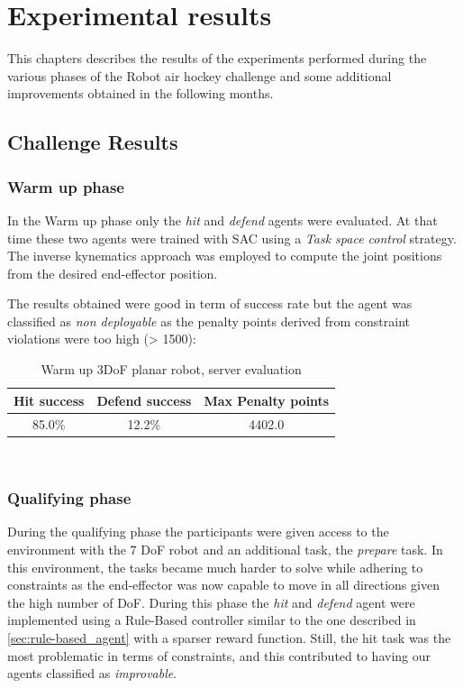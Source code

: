 \chapter{Experimental results}
\label{ch:experimental_results}

This chapters describes the results of the experiments performed during the various phases of the Robot air hockey challenge and some additional improvements obtained in the following months.

\section{Challenge Results}
\subsection{Warm up phase}
In the Warm up phase only the \textit{hit} and \textit{defend} agents were evaluated.
At that time these two agents were trained with SAC using a \textit{Task space control} strategy. The inverse kynematics approach was employed to compute the joint positions from
the desired end-effector position.

The results obtained were good in term of success rate but the agent was classified as \textit{non deployable} as the penalty points derived from constraint violations were
too high (> 1500):

\begin{table}[H]
    \centering 
    \begin{tabular}{|c | c | c |}
    \hline
     \textbf{Hit success} & \textbf{Defend success} & \textbf{Max Penalty points} \T\B \\
    \hline \hline
    85.0\% & 12.2\% & 4402.0 \T\B \\
    \hline
    \end{tabular}
    \\[10pt]
    \caption{Warm up 3DoF planar robot, server evaluation}
    \label{table:warm-up_results}
\end{table}

\subsection{Qualifying phase}
During the qualifying phase the participants were given access to the environment with the 7 DoF robot and an additional task, the \textit{prepare} task. 
In this environment, the tasks became much harder to solve
while adhering to constraints as the end-effector was now capable to move in all directions given the high number of DoF. 
During this phase the \textit{hit} and \textit{defend} agent were implemented using a Rule-Based controller similar to the one described in \ref{sec:rule-based_agent} 
with a sparser reward function.
Still, the hit task was the most problematic in terms of constraints, and this contributed to having our agents classified as \textit{improvable}. 

